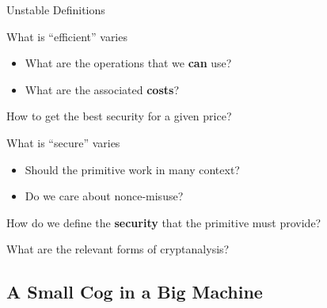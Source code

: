 \documentclass[presentation,aspectratio=1610]{beamer}
\begin{document}
\begin{frame}{Unstable Definitions}
  \begin{alertblock}{What is ``efficient'' varies}
    \begin{itemize}
    \item What are the operations that we \textbf{can} use?
    \item What are the associated \textbf{costs}? 
    \end{itemize}
    \begin{center}
      How to get the best security for a given price?
    \end{center}
  \end{alertblock}

  
  
  \begin{exampleblock}{What is ``secure'' varies}
    \begin{itemize}
    \item Should the primitive work in many context? \hfill{}
    \item Do we care about nonce-misuse? \hfill{}
    \end{itemize}
    \begin{center}
      How do we define the \textbf{security} that the primitive must provide?

      \vspace{0.3cm}\pause
      What are the relevant forms of cryptanalysis?
    \end{center}
  \end{exampleblock}
\end{frame}


\subsection{A Small Cog in a Big Machine}
\end{document}
